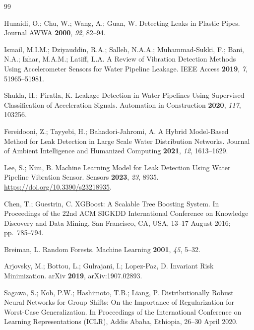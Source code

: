 \documentclass[sensors,article,submit,pdftex,oneauthor]{Definitions/mdpi}
\begin{document}


\begin{thebibliography}{99}

Hunaidi, O.; Chu, W.; Wang, A.; Guan, W.
Detecting Leaks in Plastic Pipes. Journal AWWA \textbf{2000},
\emph{92}, 82--94.

Ismail, M.I.M.; Dziyauddin, R.A.; Salleh, N.A.A.;
Muhammad-Sukki, F.; Bani, N.A.; Izhar, M.A.M.; Latiff, L.A.
A Review of Vibration Detection Methods Using Accelerometer
Sensors for Water Pipeline Leakage. IEEE Access \textbf{2019},
\emph{7}, 51965--51981.

Shukla, H.; Piratla, K.
Leakage Detection in Water Pipelines Using Supervised
Classification of Acceleration Signals. Automation in
Construction \textbf{2020}, \emph{117}, 103256.

Fereidooni, Z.; Tayyebi, H.; Bahadori-Jahromi, A.
A Hybrid Model-Based Method for Leak Detection in Large Scale
Water Distribution Networks. Journal of Ambient Intelligence
and Humanized Computing \textbf{2021}, \emph{12}, 1613--1629.

Lee, S.; Kim, B.
Machine Learning Model for Leak Detection Using Water
Pipeline Vibration Sensor. Sensors \textbf{2023}, \emph{23},
8935. \url{https://doi.org/10.3390/s23218935}.

Chen, T.; Guestrin, C.
XGBoost: A Scalable Tree Boosting System. In Proceedings of
the 22nd ACM SIGKDD International Conference on Knowledge
Discovery and Data Mining, San Francisco, CA, USA, 13--17
August 2016; pp.~785--794.

Breiman, L.
Random Forests. Machine Learning \textbf{2001}, \emph{45},
5--32.

Arjovsky, M.; Bottou, L.; Gulrajani, I.; Lopez-Paz, D.
Invariant Risk Minimization. arXiv \textbf{2019},
arXiv:1907.02893.

Sagawa, S.; Koh, P.W.; Hashimoto, T.B.; Liang, P.
Distributionally Robust Neural Networks for Group Shifts: On
the Importance of Regularization for Worst-Case
Generalization. In Proceedings of the International
Conference on Learning Representations (ICLR), Addis Ababa,
Ethiopia, 26--30 April 2020.


\end{thebibliography}
\end{document}
